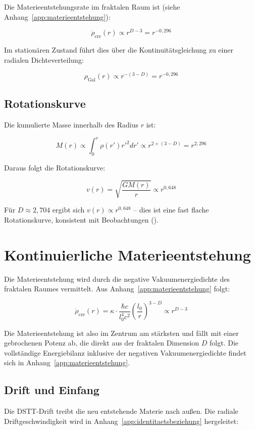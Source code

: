 Die Materieentstehungsrate im fraktalen Raum ist (siehe Anhang~\ref{app:materieentstehung}):

\[
\dot{\rho}_{\text{cre}}(r) \propto r^{D-3} = r^{-0,296}
\]

Im stationären Zustand führt dies über die Kontinuitätsgleichung zu einer radialen Dichteverteilung:

\[
\rho_{\text{Gal}}(r) \propto r^{-(3-D)} = r^{-0,296}
\]

\subsection{Rotationskurve}
\label{sub:kosmo_rotation}

Die kumulierte Masse innerhalb des Radius \( r \) ist:

\[
M(r) \propto \int_0^r \rho(r') r'^2 dr' \propto r^{2 + (3-D)} = r^{2,296}
\]

Daraus folgt die Rotationskurve:

\[
v(r) = \sqrt{\frac{GM(r)}{r}} \propto r^{0,648}
\]

Für \( D \approx 2,704 \) ergibt sich \( v(r) \propto r^{0,648} \) – dies ist eine fast flache Rotationskurve, konsistent mit Beobachtungen (\cite{Rubin1970}).

\section{Kontinuierliche Materieentstehung}
\label{sec:kosmo_materieentstehung}

Die Materieentstehung wird durch die negative Vakuumenergiedichte des fraktalen Raumes vermittelt. Aus Anhang~\ref{app:materieentstehung} folgt:

\[
\dot{\rho}_{\text{cre}}(r) = \kappa \cdot \frac{\hbar c}{l_0^4 c^2} \left( \frac{l_0}{r} \right)^{3-D} \propto r^{D-3}
\]

Die Materieentstehung ist also im Zentrum am stärksten und fällt mit einer gebrochenen Potenz ab, die direkt aus der fraktalen Dimension \( D \) folgt. Die vollständige Energiebilanz inklusive der negativen Vakuumenergiedichte findet sich in Anhang~\ref{app:materieentstehung}.

\subsection{Drift und Einfang}
\label{sub:kosmo_drift_einfang}

Die DSTT-Drift treibt die neu entstehende Materie nach außen. Die radiale Driftgeschwindigkeit wird in Anhang~\ref{app:identitaetsbeziehung} hergeleitet:

